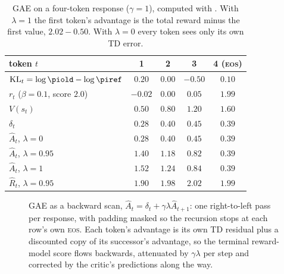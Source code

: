\begin{table}[ht]
\centering\small
\begin{tabular}{@{}lcccc@{}}
\toprule
token $t$ & 1 & 2 & 3 & 4 (\textsc{eos})\\
\midrule
$\mathrm{KL}_t=\log\piold-\log\piref$ & $0.20$ & $0.00$ & $-0.50$ & $0.10$\\
$r_t$ ($\beta=0.1$, score $2.0$) & $-0.02$ & $0.00$ & $0.05$ & $1.99$\\
$V(s_t)$ & $0.50$ & $0.80$ & $1.20$ & $1.60$\\
$\delta_t$ & $0.28$ & $0.40$ & $0.45$ & $0.39$\\
\midrule
$\hat A_t$, $\lambda=0$ & $0.28$ & $0.40$ & $0.45$ & $0.39$\\
$\hat A_t$, $\lambda=0.95$ & $1.40$ & $1.18$ & $0.82$ & $0.39$\\
$\hat A_t$, $\lambda=1$ & $1.52$ & $1.24$ & $0.84$ & $0.39$\\
$\hat R_t$, $\lambda=0.95$ & $1.90$ & $1.98$ & $2.02$ & $1.99$\\
\bottomrule
\end{tabular}
\caption{GAE on a four-token response ($\gamma=1$), computed with . With $\lambda=1$ the
first token's advantage is the total reward minus the first value, $2.02-0.50$. With $\lambda=0$
every token sees only its own TD error.}
\label{tab:rlhf:gae}
\end{table}

\begin{figure}[ht]
\centering
{}
\caption{GAE as a backward scan, $\hat A_t=\delta_t+\gamma\lambda\hat A_{t+1}$: one right-to-left
pass per response, with padding masked so the recursion stops at each row's own \textsc{eos}.
Each token's advantage is its own TD residual plus a discounted copy of its successor's advantage, so the terminal reward-model score flows backwards, attenuated by
$\gamma\lambda$ per step and corrected by the critic's predictions along the way.}
\label{fig:rlhf:gae}
\end{figure}


